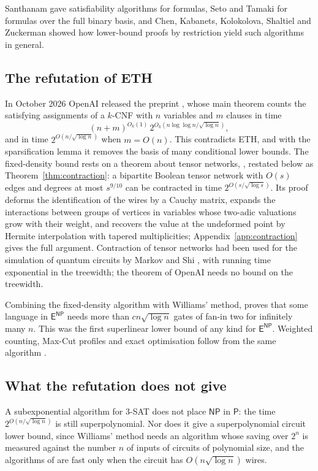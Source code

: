 \documentclass[11pt,reqno]{amsart}
\numberwithin{equation}{section}
\theoremstyle{plain}
\theoremstyle{definition}
\theoremstyle{remark}
\newcommand{\Pc}{\mathsf{P}}
\newcommand{\NP}{\mathsf{NP}}
\newcommand{\ENP}{\mathsf{E}^{\mathsf{NP}}}
\newcommand{\oai}{OpenAI}
\begin{document}
Santhanam \cite{San10} gave satisfiability algorithms for formulas, Seto and
Tamaki \cite{ST13} for formulas over the full binary basis, and Chen, Kabanets,
Kolokolova, Shaltiel and Zuckerman \cite{CKKSZ15} showed how lower-bound proofs
by restriction yield such algorithms in general.

\subsection{The refutation of ETH}
In October 2026 \oai{} released the preprint \cite{OAI26}, whose main theorem
counts the satisfying assignments of a $k$-CNF with $n$ variables and $m$
clauses in time
\[
(n+m)^{O_k(1)}\,2^{O_k(n\log\log n/\sqrt{\log n})},
\]
and in time $2^{O(n/\sqrt{\log n})}$ when $m=O(n)$. This contradicts ETH, and
with the sparsification lemma it removes the basis of many conditional lower
bounds. The fixed-density bound rests on a theorem about tensor networks,
\cite[Theorem D.1]{OAI26}, restated below as Theorem~\ref{thm:contraction}: a
bipartite Boolean tensor network with $O(s)$ edges and degrees at most
$s^{9/10}$ can be contracted in time $2^{O(s/\sqrt{\log s})}$. Its proof
deforms the identification of the wires by a Cauchy matrix, expands the
interactions between groups of vertices in variables whose two-adic valuations
grow with their weight, and recovers the value at the undeformed point by
Hermite interpolation with tapered multiplicities; Appendix~\ref{app:contraction}
gives the full argument. Contraction of tensor networks had been used for the
simulation of quantum circuits by Markov and Shi \cite{MS08}, with running time
exponential in the treewidth; the theorem of \oai{} needs no bound on the
treewidth.

Combining the fixed-density algorithm with Williams' method, \cite[Corollary
1.4]{OAI26} proves that some language in $\ENP$ needs more than $cn\sqrt{\log
n}$ gates of fan-in two for infinitely many $n$. This was the first superlinear
lower bound of any kind for $\ENP$. Weighted counting, Max-Cut profiles and
exact optimisation follow from the same algorithm \cite{BhaHex26,Bha26eth}.

\subsection{What the refutation does not give}
A subexponential algorithm for $3$-SAT does not place $\NP$ in $\Pc$: the time
$2^{O(n/\sqrt{\log n})}$ is still superpolynomial. Nor does it give a
superpolynomial circuit lower bound, since Williams' method needs an algorithm
whose saving over $2^n$ is measured against the number $n$ of inputs of
circuits of polynomial size, and the algorithms of \cite{OAI26} are fast only
when the circuit has $O(n\sqrt{\log n})$ wires.
\end{document}
